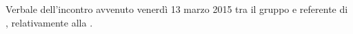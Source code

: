 Verbale dell'incontro avvenuto venerdì 13 marzo 2015 tra il gruppo \gruppo e  referente di \proponente, relativamente alla \fPA.

